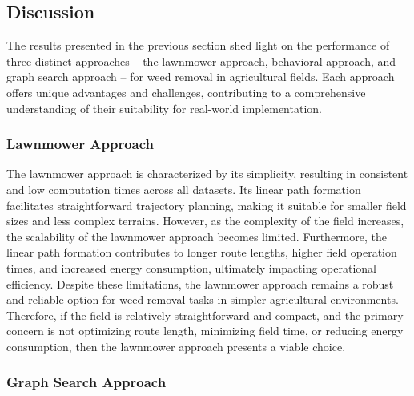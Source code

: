 
\subsection{Discussion}

The results presented in the previous section shed light on the performance of three distinct approaches – the lawnmower approach, behavioral approach, and graph search approach – for weed removal in agricultural fields. Each approach offers unique advantages and challenges, contributing to a comprehensive understanding of their suitability for real-world implementation.

\subsubsection{Lawnmower Approach}


The lawnmower approach is characterized by its simplicity, resulting in consistent and low computation times across all datasets. Its linear path formation facilitates straightforward trajectory planning, making it suitable for smaller field sizes and less complex terrains. However, as the complexity of the field increases, the scalability of the lawnmower approach becomes limited. Furthermore, the linear path formation contributes to longer route lengths, higher field operation times, and increased energy consumption, ultimately impacting operational efficiency. Despite these limitations, the lawnmower approach remains a robust and reliable option for weed removal tasks in simpler agricultural environments. Therefore, if the field is relatively straightforward and compact, and the primary concern is not optimizing route length, minimizing field time, or reducing energy consumption, then the lawnmower approach presents a viable choice.

\subsubsection{Graph Search Approach}



